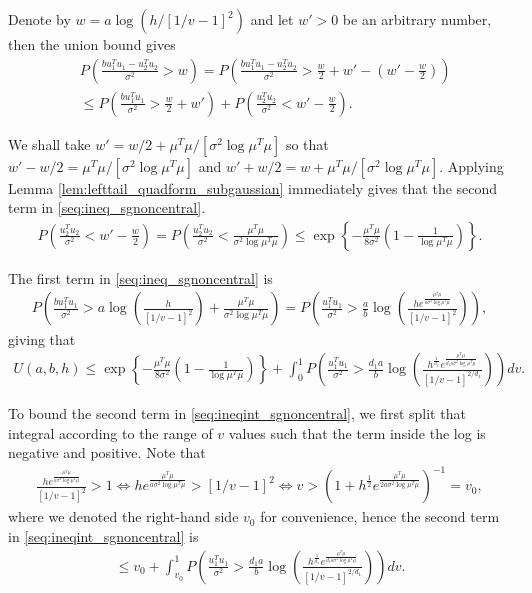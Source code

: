 Denote by $w= a \log(h/[1/v-1]^2)$ and let $w'>0$ be an arbitrary number, then the union bound gives
\begin{align}
& P \left( \frac{bu_1^Tu_1 - u_2^Tu_2}{\sigma^2}  > w \right) =
P \left(  \frac{bu_1^Tu_1 - u_2^Tu_2}{\sigma^2} > \frac{w}{2} + w' - (w' - \frac{w}{2})  \right)
\nonumber \\
&\leq P \left( \frac{b u_1^T u_1}{\sigma^2} > \frac{w}{2} + w' \right) +
P \left( \frac{u_2^Tu_2}{\sigma^2} < w' - \frac{w}{2} \right).
\label{seq:ineq_sgnoncentral}
\end{align}

We shall take $w'= w/2 + \mu^T\mu/[\sigma^2 \log \mu^T \mu]$ so that
$w' - w/2=\mu^T\mu/[\sigma^2 \log \mu^T\mu]$ and 
$w' + w/2= w + \mu^T\mu/[\sigma^2 \log \mu^T\mu]$.
Applying Lemma \ref{lem:lefttail_quadform_subgaussian} immediately gives that the second term in \eqref{seq:ineq_sgnoncentral}.
\begin{align}
 P \left( \frac{u_2^Tu_2}{\sigma^2} < w' - \frac{w}{2} \right) 
= P \left( \frac{u_2^Tu_2}{\sigma^2} < \frac{\mu^T\mu}{\sigma^2 \log \mu^T\mu} \right)
\leq \exp \left\{ -\frac{\mu^T\mu}{8\sigma^2} \left( 1 - \frac{1}{\log \mu^T\mu} \right)\right\}.
\nonumber
\end{align}

The first term in \eqref{seq:ineq_sgnoncentral} is
\begin{align}
 P \left( \frac{b u_1^T u_1}{\sigma^2} > a \log\left(\frac{h}{[1/v-1]^2}\right) + \frac{\mu^T\mu}{\sigma^2 \log \mu^T\mu} \right)=
 P \left( \frac{u_1^T u_1}{\sigma^2} > \frac{a}{b} \log\left(\frac{h e^{ \frac{\mu^T\mu}{a \sigma^2 \log \mu^T\mu}}}{[1/v-1]^2}\right) \right),
\nonumber
\end{align}
giving that
\begin{align}
 U(a,b,h) \leq \exp \left\{ -\frac{\mu^T\mu}{8\sigma^2} \left( 1 - \frac{1}{\log \mu^T\mu} \right)\right\} +
\int_0^1  P \left( \frac{u_1^T u_1}{\sigma^2} > \frac{d_1 a}{b} \log\left(\frac{h^{\frac{1}{d_1}} e^{ \frac{\mu^T\mu}{d_1 a \sigma^2 \log \mu^T\mu}}}{[1/v-1]^{2/d_1} }\right) \right) dv.
\label{seq:ineqint_sgnoncentral}
\end{align}

To bound the second term in \eqref{seq:ineqint_sgnoncentral}, we first split that integral according to the range of $v$ values such that the term inside the log is negative and positive. Note that
\begin{align}
\frac{h e^{ \frac{\mu^T\mu}{a \sigma^2 \log \mu^T\mu}}}{[1/v-1]^{2}} > 1
\Leftrightarrow
h e^{ \frac{\mu^T\mu}{a \sigma^2 \log \mu^T\mu}} > [1/v-1]^{2}
\Leftrightarrow
v > \left( 1 + h^{\frac{1}{2}} e^{ \frac{\mu^T\mu}{2a \sigma^2 \log \mu^T\mu}} \right)^{-1}=v_0,
\nonumber
\end{align}
where we denoted the right-hand side $v_0$ for convenience, hence the second term in \eqref{seq:ineqint_sgnoncentral} is
\begin{align}
\leq v_0 + \int_{v_0}^1  P \left( \frac{u_1^T u_1}{\sigma^2} > \frac{d_1 a}{b} \log\left(\frac{h^{\frac{1}{d_1}} e^{ \frac{\mu^T\mu}{d_1 a \sigma^2 \log \mu^T\mu}}}{[1/v-1]^{2/d_1} }\right) \right) dv.
\label{seq:ineqint_sgnoncentral_term2}
\end{align}

